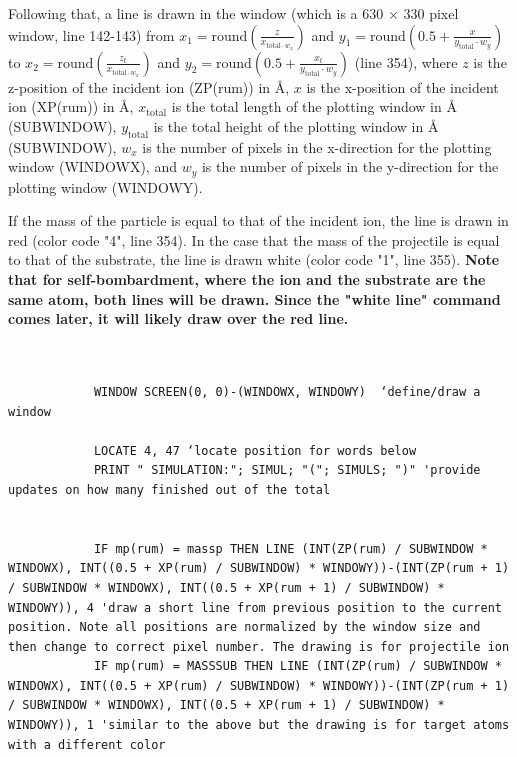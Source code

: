\documentclass[10pt, reqno]{exam}
\begin{document}
Following that, a line is drawn in the window (which is a 630 $\times$ 330 pixel window, line 142-143) from $x_1 = \text{round}\left(\frac{z}{x_{\text{total}\cdot w_x}}\right)$ and $y_1 = \text{round}\left(0.5 + \frac{x}{y_{\text{total}}\cdot w_y}\right)$ to $x_2 = \text{round}\left(\frac{z_t}{x_{\text{total}\cdot w_x}}\right)$ and $y_2 = \text{round}\left(0.5 + \frac{x_t}{y_{\text{total}}\cdot w_y}\right)$ (line 354), where $z$ is the z-position of the incident ion (ZP(rum)) in \si{\angstrom}, $x$ is the x-position of the incident ion (XP(rum)) in \si{\angstrom}, $x_{\text{total}}$ is the total length of the plotting window in \si{\angstrom} (SUBWINDOW), $y_{\text{total}}$ is the total height of the plotting window in \si{\angstrom} (SUBWINDOW), $w_x$ is the number of pixels in the x-direction for the plotting window (WINDOWX), and $w_y$ is the number of pixels in the y-direction for the plotting window (WINDOWY). \par

If the mass of the particle is equal to that of the incident ion, the line is drawn in red (color code  "4", line 354). In the case that the mass of the projectile is equal to that of the substrate, the line is drawn white (color code "1", line 355). \textbf{Note that for self-bombardment, where the ion and the substrate are the same atom, both lines will be drawn. Since the "white line" command comes later, it will likely draw over the red line.}

\begin{verbatim}   

    
            WINDOW SCREEN(0, 0)-(WINDOWX, WINDOWY)  ‘define/draw a window
    
            LOCATE 4, 47 ‘locate position for words below
            PRINT " SIMULATION:"; SIMUL; "("; SIMULS; ")" 'provide updates on how many finished out of the total

    
            IF mp(rum) = massp THEN LINE (INT(ZP(rum) / SUBWINDOW * WINDOWX), INT((0.5 + XP(rum) / SUBWINDOW) * WINDOWY))-(INT(ZP(rum + 1) / SUBWINDOW * WINDOWX), INT((0.5 + XP(rum + 1) / SUBWINDOW) * WINDOWY)), 4 'draw a short line from previous position to the current position. Note all positions are normalized by the window size and then change to correct pixel number. The drawing is for projectile ion
            IF mp(rum) = MASSSUB THEN LINE (INT(ZP(rum) / SUBWINDOW * WINDOWX), INT((0.5 + XP(rum) / SUBWINDOW) * WINDOWY))-(INT(ZP(rum + 1) / SUBWINDOW * WINDOWX), INT((0.5 + XP(rum + 1) / SUBWINDOW) * WINDOWY)), 1 'similar to the above but the drawing is for target atoms with a different color
\end{verbatim}
\end{document}
